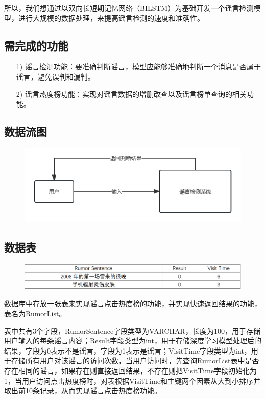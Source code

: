 \documentclass{article}
\begin{document}
所以，我们想通过以双向长短期记忆网络（BILSTM）为基础开发一个谣言检测模型，进行大规模的数据处理，来提高谣言检测的速度和准确性。

\subsection{需完成的功能}
\begin{itemize}
  \item [1)]    谣言检测功能：要准确判断谣言，模型应能够准确地判断一个消息是否属于谣言，避免误判和漏判。
  \item [2)]    谣言热度榜功能：实现对谣言数据的增删改查以及谣言榜单查询的相关功能。
\end{itemize}

\subsection{数据流图}

\begin{figure}[H]
    \centering
    \includegraphics[scale=0.6]{pircture/数据流图.png}
\end{figure}

\subsection{数据表}
\begin{figure}[H]
    \centering
    \includegraphics[scale=0.2]{pircture/数据表.png}
\end{figure}

数据库中存放一张表来实现谣言点击热度榜的功能，并实现快速返回结果的功能，表名为RumorList。

表中共有3个字段，RumorSentence字段类型为VARCHAR，长度为100，用于存储用户输入的每条谣言内容；Result字段类型为int，用于存储深度学习模型处理后的结果，字段为0表示不是谣言，字段为1表示是谣言；VisitTime字段类型为int，用于存储所有用户对该谣言的访问次数，当用户访问时，先查询RumorList表中是否存在相同的谣言，如果存在则直接返回结果，不存在则把VisitTime字段初始化为1，当用户访问点击热度榜时，对表根据VisitTime和主键两个因素从大到小排序并取出前10条记录，从而实现谣言点击热度榜功能。
\end{document}
